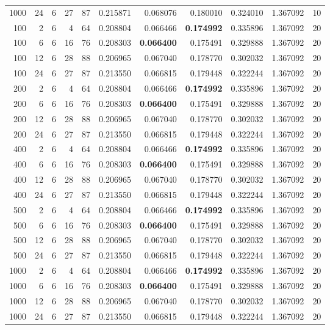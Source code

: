 \begin{table}
\begin{tabular}{rrrrrrrrrrr}
1000 & 24 & 6 & 27 & 87 & 0.215871 & 0.068076 & 0.180010 & 0.324010 & 1.367092 & 10 \\
100 & 2 & 6 & 4 & 64 & 0.208804 & 0.066466 & \textbf{0.174992} & 0.335896 & 1.367092 & 20 \\
100 & 6 & 6 & 16 & 76 & 0.208303 & \textbf{0.066400} & 0.175491 & 0.329888 & 1.367092 & 20 \\
100 & 12 & 6 & 28 & 88 & 0.206965 & 0.067040 & 0.178770 & 0.302032 & 1.367092 & 20 \\
100 & 24 & 6 & 27 & 87 & 0.213550 & 0.066815 & 0.179448 & 0.322244 & 1.367092 & 20 \\
200 & 2 & 6 & 4 & 64 & 0.208804 & 0.066466 & \textbf{0.174992} & 0.335896 & 1.367092 & 20 \\
200 & 6 & 6 & 16 & 76 & 0.208303 & \textbf{0.066400} & 0.175491 & 0.329888 & 1.367092 & 20 \\
200 & 12 & 6 & 28 & 88 & 0.206965 & 0.067040 & 0.178770 & 0.302032 & 1.367092 & 20 \\
200 & 24 & 6 & 27 & 87 & 0.213550 & 0.066815 & 0.179448 & 0.322244 & 1.367092 & 20 \\
400 & 2 & 6 & 4 & 64 & 0.208804 & 0.066466 & \textbf{0.174992} & 0.335896 & 1.367092 & 20 \\
400 & 6 & 6 & 16 & 76 & 0.208303 & \textbf{0.066400} & 0.175491 & 0.329888 & 1.367092 & 20 \\
400 & 12 & 6 & 28 & 88 & 0.206965 & 0.067040 & 0.178770 & 0.302032 & 1.367092 & 20 \\
400 & 24 & 6 & 27 & 87 & 0.213550 & 0.066815 & 0.179448 & 0.322244 & 1.367092 & 20 \\
500 & 2 & 6 & 4 & 64 & 0.208804 & 0.066466 & \textbf{0.174992} & 0.335896 & 1.367092 & 20 \\
500 & 6 & 6 & 16 & 76 & 0.208303 & \textbf{0.066400} & 0.175491 & 0.329888 & 1.367092 & 20 \\
500 & 12 & 6 & 28 & 88 & 0.206965 & 0.067040 & 0.178770 & 0.302032 & 1.367092 & 20 \\
500 & 24 & 6 & 27 & 87 & 0.213550 & 0.066815 & 0.179448 & 0.322244 & 1.367092 & 20 \\
1000 & 2 & 6 & 4 & 64 & 0.208804 & 0.066466 & \textbf{0.174992} & 0.335896 & 1.367092 & 20 \\
1000 & 6 & 6 & 16 & 76 & 0.208303 & \textbf{0.066400} & 0.175491 & 0.329888 & 1.367092 & 20 \\
1000 & 12 & 6 & 28 & 88 & 0.206965 & 0.067040 & 0.178770 & 0.302032 & 1.367092 & 20 \\
1000 & 24 & 6 & 27 & 87 & 0.213550 & 0.066815 & 0.179448 & 0.322244 & 1.367092 & 20 \\

\end{tabular}
\end{table}
